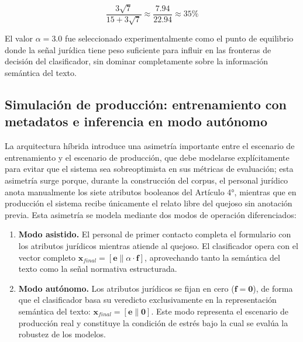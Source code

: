 \begin{equation*}
  \frac{3\sqrt{7}}{15 + 3\sqrt{7}} \approx \frac{7.94}{22.94} \approx 35\%
\end{equation*}

El valor $\alpha = 3.0$ fue seleccionado experimentalmente como el punto de
equilibrio donde la señal jurídica tiene peso suficiente para influir en las
fronteras de decisión del clasificador, sin dominar completamente sobre la
información semántica del texto.

\subsection{Simulación de producción: entrenamiento con metadatos
            e inferencia en modo autónomo}

La arquitectura híbrida introduce una asimetría importante entre el escenario de
entrenamiento y el escenario de producción, que debe modelarse explícitamente
para evitar que el sistema sea sobreoptimista en sus métricas de evaluación; esta
asimetría surge porque, durante la construcción del corpus, el personal jurídico
anota manualmente los siete atributos booleanos del Artículo 4°, mientras que en
producción el sistema recibe únicamente el relato libre del quejoso sin anotación
previa. Esta asimetría se modela mediante dos modos de operación diferenciados:

\begin{enumerate}
  \item \textbf{Modo asistido.} El personal de primer contacto completa el
        formulario con los atributos jurídicos mientras atiende al quejoso. El
        clasificador opera con el vector completo
        $\mathbf{x}_{final} = [\mathbf{e} \| \alpha \cdot \mathbf{f}]$,
        aprovechando tanto la semántica del texto como la señal normativa
        estructurada.

  \item \textbf{Modo autónomo.} Los atributos jurídicos se fijan en cero
        ($\mathbf{f} = \mathbf{0}$), de forma que el clasificador basa su
        veredicto exclusivamente en la representación semántica del texto:
        $\mathbf{x}_{final} = [\mathbf{e} \| \mathbf{0}]$.
        Este modo representa el escenario de producción real y constituye la
        condición de estrés bajo la cual se evalúa la robustez de los modelos.
\end{enumerate}

